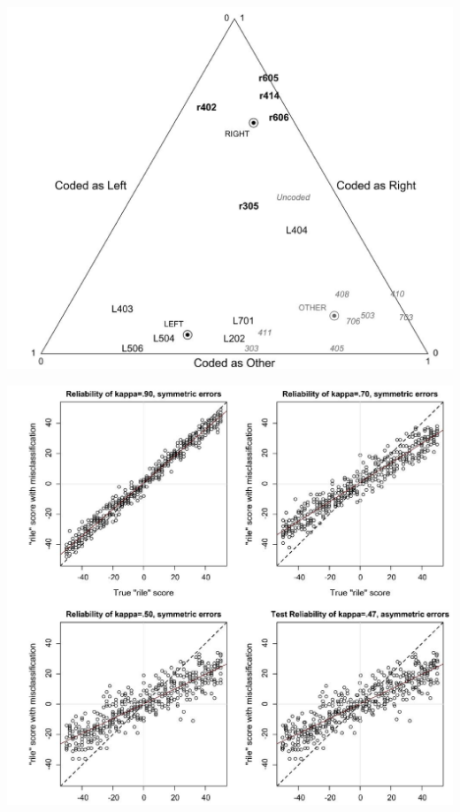 \documentclass[11pt,compress,professionalfonts]{beamer}
\begin{document}
\centerline{\includegraphics[scale=.7]{pictures/slava-rile2}}


\centerline{\includegraphics[scale=.6]{pictures/slava-rile}}
\end{document}
